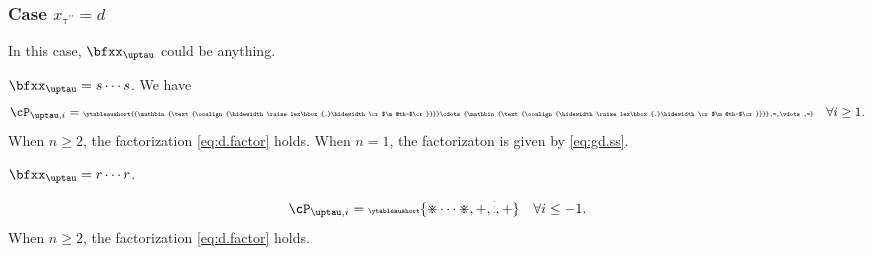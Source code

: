 \documentclass[12pt,a4paper]{amsart}
\makeatletter
\numberwithin{equation}{section}
\theoremstyle{remark}
\def\bsign{{}^b\mathrm{Sign}}
\let\ytb=\ytableaushort
\newcommand{\tytb}[1]{{\tiny\ytb{#1}}}
\newcommand{\dotminus}{\mathbin{\text{\@dotminus}}}
\newcommand{\@dotminus}{%
  \ooalign{\hidewidth\raise1ex\hbox{.}\hidewidth\cr$\m@th-$\cr}%
}
\def\pcL{\cL^+}
\def\ncL{\cL^-}
\def\pcB{\cB^+}
\def\ncB{\cB^-}
\def\uptaupp{\uptau^{\prime\prime}}
\def\uum{{\dotminus}}
\def\uup{\divideontimes}
\makeatother
\begin{document}
{  \subsubsection{Case $x_{\uptaupp}=d$}\label{sec:z.d}
  In this case, $\bfxx_{\uptau}$ could be anything.
  \begin{enumT}
    \item $\bfxx_{\uptau}=s\cdots s$. We have
    \[
      \cP_{\uptau,i} = \tytb{\uum\cdots\uum,=,\vdots,=} \quad \forall i\geq 1.
    \]
    When $n\geq 2$, the factorization \eqref{eq:d.factor} holds.
    When $n=1$, the factorizaton is given by \eqref{eq:gd.ss}.
    \item $\bfxx_{\uptau}=r\cdots r$.
    \[
      \cP_{\uptau,i} = \tytb{\uup\cdots\uup,+,\vdots,+} \quad \forall i\leq -1.
    \]
    When $n\geq 2$, the factorization \eqref{eq:d.factor} holds.


\end{enumT}}
\end{document}
